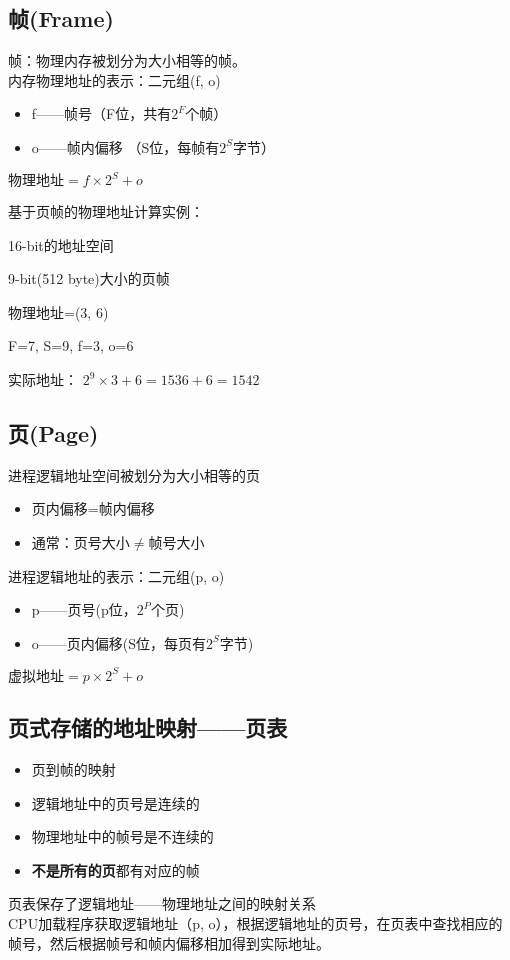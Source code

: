 \subsection{帧(Frame)}
帧：物理内存被划分为大小相等的帧。\\
内存物理地址的表示：二元组(f, o)
\begin{itemize}
	\item f——帧号（F位，共有$2^F$个帧）
	\item o——帧内偏移 （S位，每帧有$2^S$字节）
\end{itemize}
\begin{center}
	$\text{物理地址}=f\times2^S+o$
\end{center}
基于页帧的物理地址计算实例：\par
16-bit的地址空间\par
9-bit(512 byte)大小的页帧\par
物理地址=(3, 6)\par 
F=7, S=9, f=3, o=6\par 
实际地址：
$2^9\times3+6=1536+6=1542$
\subsection{页(Page)}
进程逻辑地址空间被划分为大小相等的页
\begin{itemize}
	\item 页内偏移=帧内偏移
	\item 通常：页号大小$\neq$帧号大小
\end{itemize}
进程逻辑地址的表示：二元组(p, o)
\begin{itemize}
	\item p——页号(p位，$2^P$个页)
	\item o——页内偏移(S位，每页有$2^S$字节)
\end{itemize}
$\text{虚拟地址}=p\times2^S+o$
\subsection{页式存储的地址映射——页表}
\begin{itemize}
	\item 页到帧的映射
	\item 逻辑地址中的页号是连续的
	\item 物理地址中的帧号是不连续的
	\item \textbf{不是所有的页}都有对应的帧
\end{itemize}
页表保存了逻辑地址——物理地址之间的映射关系\\
CPU加载程序获取逻辑地址（p, o），根据逻辑地址的页号，在页表中查找相应的
帧号，然后根据帧号和帧内偏移相加得到实际地址。
